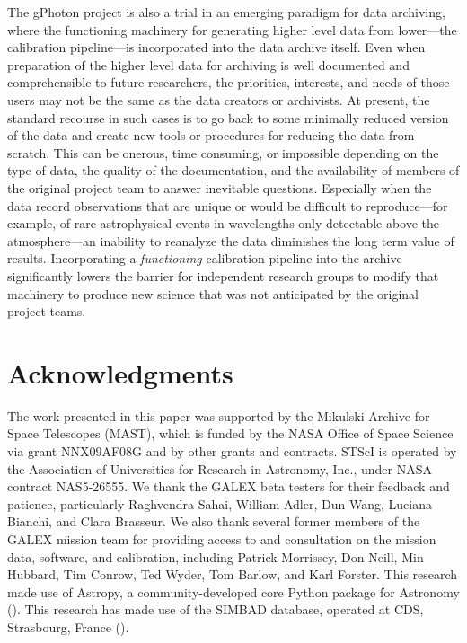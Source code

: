 \documentclass[iop]{emulateapj}
\begin{document}
The gPhoton project is also a trial in an emerging paradigm for data archiving, where the functioning machinery for generating higher level data from lower---the calibration pipeline---is incorporated into the data archive itself. Even when preparation of the higher level data for archiving is well documented and comprehensible to future researchers, the priorities, interests, and needs of those users may not be the same as the data creators or archivists. At present, the standard recourse in such cases is to go back to some minimally reduced version of the data and create new tools or procedures for reducing the data from scratch. This can be onerous, time consuming, or impossible depending on the type of data, the quality of the documentation, and the availability of members of the original project team to answer inevitable questions. Especially when the data record observations that are unique or would be difficult to reproduce---for example, of rare astrophysical events in wavelengths only detectable above the atmosphere---an inability to reanalyze the data diminishes the long term value of results. Incorporating a \emph{functioning} calibration pipeline into the archive significantly lowers the barrier for independent research groups to modify that machinery to produce new science that was not anticipated by the original project teams.

\section{Acknowledgments}
The work presented in this paper was supported by the Mikulski Archive for Space Telescopes (MAST), which is funded by the NASA Office of Space Science via grant NNX09AF08G and by other grants and contracts. STScI is operated by the Association of Universities for Research in Astronomy, Inc., under NASA contract NAS5-26555.  We thank the GALEX beta testers for their feedback and patience, particularly Raghvendra Sahai, William Adler, Dun Wang, Luciana Bianchi, and Clara Brasseur.  We also thank several former members of the GALEX mission team for providing access to and consultation on the mission data, software, and calibration, including Patrick Morrissey, Don Neill, Min Hubbard, Tim Conrow, Ted Wyder, Tom Barlow, and Karl Forster.  This research made use of Astropy, a community-developed core Python package for Astronomy (\cite{astropy}). This research has made use of the SIMBAD database, operated at CDS, Strasbourg, France (\cite{simbad}).


\end{document}
